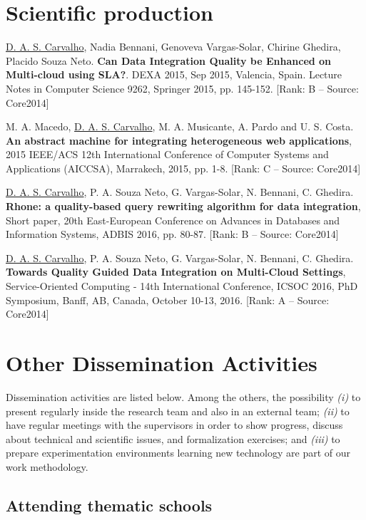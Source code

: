 \section{Scientific production}

\noindent
\underline{D. A. S. Carvalho}, Nadia Bennani, Genoveva Vargas-Solar, Chirine Ghedira, Placido Souza Neto. \textbf{Can Data Integration Quality be Enhanced on Multi-cloud using SLA?}. DEXA 2015, Sep 2015, Valencia, Spain. Lecture Notes in Computer Science 9262, Springer 2015, pp. 145-152. [Rank: B -- Source: Core2014]

\bigskip
\noindent
M. A. Macedo, \underline{D. A. S. Carvalho}, M. A. Musicante, A. Pardo and U. S. Costa. \textbf{An abstract machine for integrating heterogeneous web applications}, 2015 IEEE/ACS 12th International Conference of Computer Systems and Applications (AICCSA), Marrakech, 2015, pp. 1-8. [Rank: C -- Source: Core2014]

\bigskip
\noindent 
\underline{D. A. S. Carvalho}, P. A. Souza Neto, G. Vargas-Solar, N. Bennani, C. Ghedira. \textbf{Rhone: a quality-based
query rewriting algorithm for data integration}, Short paper, 20th East-European Conference on Advances
in Databases and Information Systems, ADBIS 2016, pp. 80-87. [Rank: B -- Source: Core2014]

\bigskip
\noindent 
\underline{D. A. S. Carvalho}, P. A. Souza Neto, G. Vargas-Solar, N. Bennani, C. Ghedira. 
\textbf{Towards Quality Guided Data Integration on Multi-Cloud Settings},
Service-Oriented Computing - 14th International Conference, ICSOC 2016, PhD Symposium, Banff, AB, Canada, October 10-13, 2016. [Rank: A -- Source: Core2014]

\section{Other Dissemination Activities}

Dissemination activities are listed below. Among the others, the possibility \textit{(i)} to present regularly inside the research team and also in an external team; \textit{(ii)} to have regular meetings with the supervisors in order to show progress, discuss about technical and scientific issues, and formalization exercises; and \textit{(iii)} to prepare experimentation environments learning new technology are part of our work methodology. 

\subsection{Attending thematic schools}

